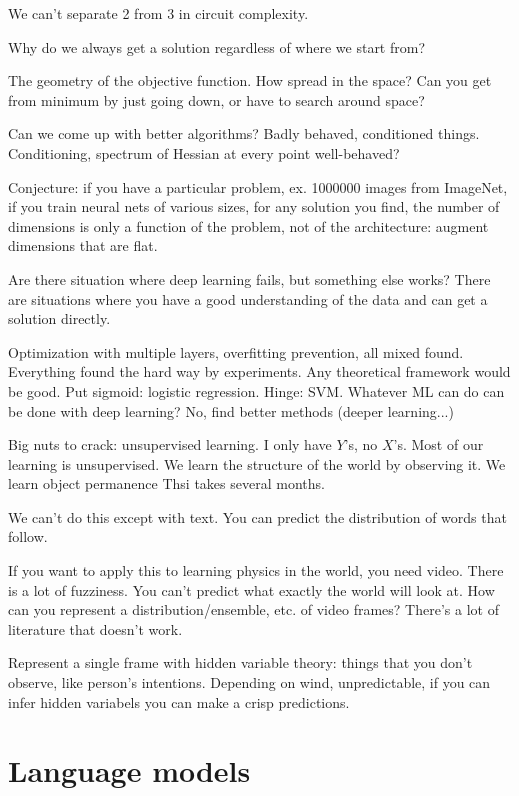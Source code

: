 We can't separate 2 from 3 in circuit complexity.

Why do we always get a solution regardless of where we start from?

The geometry of the objective function. %
How spread in the space? Can you get from minimum by just going down, or have to search around space?

Can we come up with better algorithms? Badly behaved, conditioned things. Conditioning, spectrum of Hessian at every point well-behaved?

Conjecture: if you have a particular problem, ex. 1000000 images from ImageNet, if you train neural nets of various sizes, for any solution you find, the number of dimensions is only a function of the problem, not of the architecture: augment dimensions that are flat.

Are there situation where deep learning fails, but something else works? There are situations where you have a good understanding of the data and can get a solution directly.

Optimization with multiple layers, overfitting prevention, all mixed found. Everything found the hard way by experiments. Any theoretical framework would be good.
Put sigmoid: logistic regression. Hinge: SVM. Whatever ML can do can be done with deep learning? No, find better methods (deeper learning...)

Big nuts to crack: unsupervised learning. I only have $Y$'s, no $X$'s. Most of our learning is unsupervised. We learn the structure of the world by observing it. We learn object permanence Thsi takes several months. 

We can't do this except with text. You can predict the distribution of words that follow. 

If you want to apply this to learning physics in the world, you need video. There is a lot of fuzziness. You can't predict what exactly the world will look at. How can you represent a distribution/ensemble, etc. of video frames? There's a lot of literature that doesn't work.

Represent a single frame with hidden variable theory: things that you don't observe, like person's intentions. Depending on wind, unpredictable, if you can infer hidden variabels you can make a crisp predictions. 

\section{Language models}

